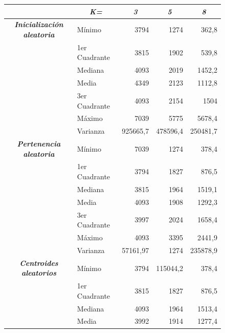 \documentclass[a4paper]{report}
\begin{document}
	
	\begin{figure}[htbp]
	\begin{center}
	\begin{tabular}{|c|l|r|r|r|}
	\hline
	\multicolumn{1}{|l|}{\textbf{\textit{}}} & \multicolumn{1}{c|}{\textbf{\textit{K=}}} & \multicolumn{1}{c|}{\textbf{\textit{3}}} & \multicolumn{1}{c|}{\textbf{\textit{5}}} & \multicolumn{1}{c|}{\textbf{\textit{8}}} \\ \hline
	\multicolumn{ 1}{|c|}{\textbf{\textit{Inicialización aleatoria}}} & Mínimo & 3794 & 1274 & 362,8 \\ \cline{ 2- 5}
	\multicolumn{ 1}{|c|}{} & 1er Cuadrante & 3815 & 1902 & 539,8 \\ \cline{ 2- 5}
	\multicolumn{ 1}{|c|}{} & Mediana & 4093 & 2019 & 1452,2 \\ \cline{ 2- 5}
	\multicolumn{ 1}{|c|}{} & Media & 4349 & 2123 & 1112,8 \\ \cline{ 2- 5}
	\multicolumn{ 1}{|c|}{} & 3er Cuadrante & 4093 & 2154 & 1504 \\ \cline{ 2- 5}
	\multicolumn{ 1}{|c|}{} & Máximo & 7039 & 5775 & 5678,4 \\ \cline{ 2- 5}
	\multicolumn{ 1}{|c|}{} & Varianza & 925665,7 & 478596,4 & 250481,7 \\ \hline
	\multicolumn{ 1}{|c|}{\textbf{\textit{Pertenencia aleatoria}}} & Mínimo & 7039 & 1274 & 378,4 \\ \cline{ 2- 5}
	\multicolumn{ 1}{|c|}{} & 1er Cuadrante & 3794 & 1827 & 876,5 \\ \cline{ 2- 5}
	\multicolumn{ 1}{|c|}{} & Mediana & 3815 & 1964 & 1519,1 \\ \cline{ 2- 5}
	\multicolumn{ 1}{|c|}{} & Media & 4093 & 1908 & 1292,3 \\ \cline{ 2- 5}
	\multicolumn{ 1}{|c|}{} & 3er Cuadrante & 3997 & 2024 & 1658,4 \\ \cline{ 2- 5}
	\multicolumn{ 1}{|c|}{} & Máximo & 4093 & 3395 & 2441,9 \\ \cline{ 2- 5}
	\multicolumn{ 1}{|c|}{} & Varianza & 57161,97 & 1274 & 235878,9 \\ \hline
	\multicolumn{ 1}{|c|}{\textbf{\textit{Centroides aleatorios}}} & Mínimo & 3794 & 115044,2 & 378,4 \\ \cline{ 2- 5}
	\multicolumn{ 1}{|c|}{} & 1er Cuadrante & 3815 & 1827 & 876,5 \\ \cline{ 2- 5}
	\multicolumn{ 1}{|c|}{} & Mediana & 4093 & 1964 & 1513,4 \\ \cline{ 2- 5}
	\multicolumn{ 1}{|c|}{} & Media & 3992 & 1914 & 1277,4 \\ \cline{ 2- 5}

\end{tabular}
\end{center}
\end{figure}
\end{document}
